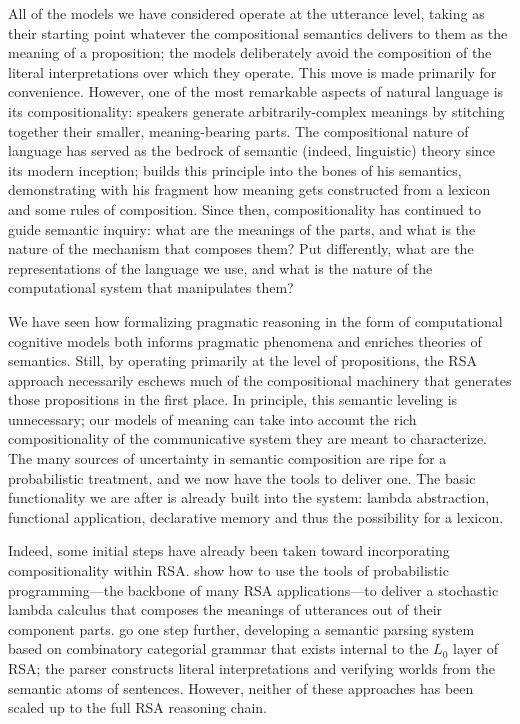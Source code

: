 \documentclass[10pt,letterpaper]{article}
\begin{document}
All of the models we have considered operate at the utterance level, taking as their starting point whatever the compositional semantics delivers to them as the meaning of a proposition; the models deliberately avoid the composition of the literal interpretations over which they operate. This move is made primarily for convenience. However, one of the most remarkable aspects of natural language is its compositionality: speakers generate arbitrarily-complex meanings by stitching together their smaller, meaning-bearing parts. The compositional nature of language has served as the bedrock of semantic (indeed, linguistic) theory since its modern inception; \cite{montague1973} builds this principle into the bones of his semantics, demonstrating with his fragment how meaning gets constructed from a lexicon and some rules of composition. Since then, compositionality has continued to guide semantic inquiry: what are the meanings of the parts, and what is the nature of the mechanism that composes them? Put differently, what are the representations of the language we use, and what is the nature of the computational system that manipulates them?

We have seen how formalizing pragmatic reasoning in the form of computational cognitive models both informs pragmatic phenomena and enriches theories of semantics. Still, by operating primarily at the level of propositions, the RSA approach necessarily eschews much of the compositional machinery that generates those propositions in the first place. In principle, this semantic leveling is unnecessary; our models of meaning can take into account the rich compositionality of the communicative system they are meant to characterize. The many sources of uncertainty in semantic composition are ripe for a probabilistic treatment, and we now have the tools to deliver one. The basic functionality we are after is already built into the system: lambda abstraction, functional application, declarative memory and thus the possibility for a lexicon.

Indeed, some initial steps have already been taken toward incorporating compositionality within RSA. \cite{goodmanlassiter2015handbook} show how to use the tools of probabilistic programming---the backbone of many RSA applications---to deliver a stochastic lambda calculus that composes the meanings of utterances out of their component parts. \cite{goodmanstuhlmuller2014} go one step further, developing a semantic parsing system based on combinatory categorial grammar that exists internal to the $L_0$ layer of RSA; the parser constructs literal interpretations and verifying worlds from the semantic atoms of sentences. However, neither of these approaches has been scaled up to the full RSA reasoning chain.
\end{document}
